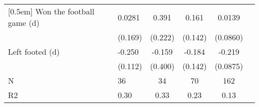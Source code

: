 {\begin{tabularx}{\textwidth}{Xl*{4}{c}}
[0.5em]
Won the football game (d)&      0.0281         &       0.391\sym{*}  &       0.161         &      0.0139         \\
                    &     (0.169)         &     (0.222)         &     (0.142)         &    (0.0860)         \\
[0.5em]
Left footed (d)     &      -0.250\sym{**} &      -0.159         &      -0.184         &      -0.219\sym{**} \\
                    &     (0.112)         &     (0.400)         &     (0.142)         &    (0.0875)         \\
\hline
N                   &          36         &          34         &          70         &         162         \\
R2                  &        0.30         &        0.33         &        0.23         &        0.13         \\
\hline\hline
\end{tabularx}
}
